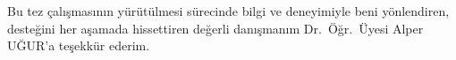Bu tez \c{c}al\i \c{s}mas\i n\i n y\"ur\"ut\"ulmesi s\"urecinde bilgi ve deneyimiyle beni y\"onlendiren, deste\u{g}ini her a\c{s}amada hissettiren de\u{g}erli dan\i \c{s}man\i m Dr.~\"O\u{g}r.~\"Uyesi Alper U\u{G}UR'a te\c{s}ekk\"ur ederim.
